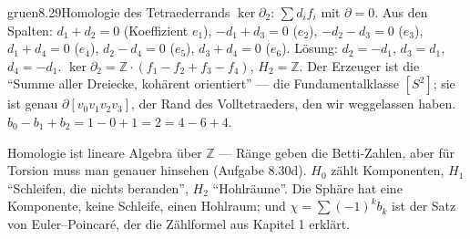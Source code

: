 \begin{loesungkarte}{gruen}{8.29}{Homologie des Tetraederrands}
$\ker\partial_2$: $\sum d_if_i$ mit $\partial = 0$. Aus den Spalten: $d_1 + d_2 = 0$ (Koeffizient $e_1$), $-d_1 + d_3 = 0$ ($e_2$), $-d_2 - d_3 = 0$ ($e_3$), $d_1 + d_4 = 0$ ($e_4$), $d_2 - d_4 = 0$ ($e_5$), $d_3 + d_4 = 0$ ($e_6$). Lösung: $d_2 = -d_1$, $d_3 = d_1$, $d_4 = -d_1$. $\ker\partial_2 = \mathbb Z\cdot(f_1 - f_2 + f_3 - f_4)$, $H_2 = \mathbb Z$. Der Erzeuger ist die \enquote{Summe aller Dreiecke, kohärent orientiert} --- die Fundamentalklasse $[S^{2}]$; sie ist genau $\partial[v_0v_1v_2v_3]$, der Rand des Volltetraeders, den wir weggelassen haben.
$b_0 - b_1 + b_2 = 1 - 0 + 1 = 2 = 4 - 6 + 4$. \checkmark
\begin{mitnehmen}\kastentext
Homologie ist lineare Algebra über $\mathbb Z$ --- Ränge geben die Betti-Zahlen, aber für Torsion muss man genauer hinsehen (Aufgabe 8.30d). $H_0$ zählt Komponenten, $H_1$ \enquote{Schleifen, die nichts beranden}, $H_2$ \enquote{Hohlräume}. Die Sphäre hat eine Komponente, keine Schleife, einen Hohlraum; und $\chi = \sum(-1)^{k}b_k$ ist der Satz von Euler--Poincaré, der die Zählformel aus Kapitel 1 erklärt.
\end{mitnehmen}
\end{loesungkarte}

